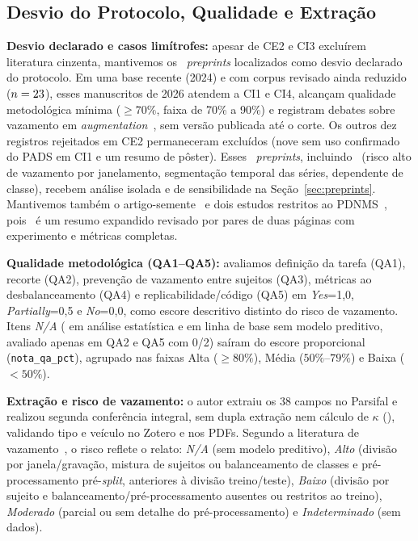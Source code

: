 \subsection{Desvio do Protocolo, Qualidade e Extração}\label{sec:desvio_qa}

\textbf{Desvio declarado e casos limítrofes:} apesar de CE2 e CI3 excluírem
literatura cinzenta, mantivemos os \nPreprints\ \textit{preprints} localizados como
desvio declarado do protocolo. Em uma base recente (2024) e com corpus revisado
ainda reduzido ($n=23$), esses manuscritos de 2026 atendem a CI1 e
CI4, alcançam qualidade metodológica mínima ($\ge 70\%$, faixa de 70\% a 90\%) e
registram debates sobre vazamento em \textit{augmentation}~\cite{djemaa_quantifying_2026},
sem versão publicada até o corte. Os outros dez registros rejeitados em CE2
permaneceram excluídos (nove sem uso confirmado do PADS em CI1 e um resumo de
pôster). Esses \nPreprints\ \textit{preprints},
incluindo~\cite{zannat_label-efficient_2026} (risco alto de vazamento por
janelamento, segmentação temporal das séries, dependente de classe), recebem
análise isolada e de sensibilidade na Seção~\ref{sec:preprints}. Mantivemos
também o artigo-semente~\cite{varghese_machine_2024} e dois estudos restritos ao
PDNMS~\cite{padilha_parkinsons_2024,ouabd_parkinsons_2026}, pois~\cite{padilha_parkinsons_2024}
é um resumo expandido revisado por pares de duas páginas com experimento e métricas
completas.

\textbf{Qualidade metodológica (QA1--QA5):} avaliamos definição da tarefa (QA1),
recorte (QA2), prevenção de vazamento entre sujeitos (QA3), métricas ao
desbalanceamento (QA4) e replicabilidade/código (QA5) em \textit{Yes}=1,0,
\textit{Partially}=0,5 e \textit{No}=0,0, como escore descritivo distinto do
risco de vazamento. Itens \textit{N/A} (\cite{abola_differentiating_2025} em
análise estatística e \cite{ren_baseline_2026} em linha de base sem modelo
preditivo, avaliado apenas em QA2 e QA5 com 0/2) saíram do escore proporcional
(\texttt{nota\_qa\_pct}), agrupado nas faixas Alta ($\ge 80\%$), Média
($50\%$--$79\%$) e Baixa ($<50\%$).

\textbf{Extração e risco de vazamento:} o autor extraiu os 38 campos no Parsifal
e realizou segunda conferência integral, sem dupla extração nem cálculo de
$\kappa$ (\cite{garritty_cochrane_2021}), validando tipo e veículo no Zotero e
nos PDFs. Segundo a literatura de
vazamento~\cite{kapoor_leakage_2023,vandewiele_overly_2021,djemaa_quantifying_2026},
o risco reflete o relato: \textit{N/A} (sem modelo preditivo), \textit{Alto}
(divisão por janela/gravação, mistura de sujeitos ou balanceamento de classes e
pré-processamento pré-\textit{split}, anteriores à divisão treino/teste),
\textit{Baixo} (divisão por sujeito e balanceamento/pré-processamento ausentes ou
restritos ao treino), \textit{Moderado} (parcial ou sem detalhe do
pré-processamento) e \textit{Indeterminado} (sem dados).
